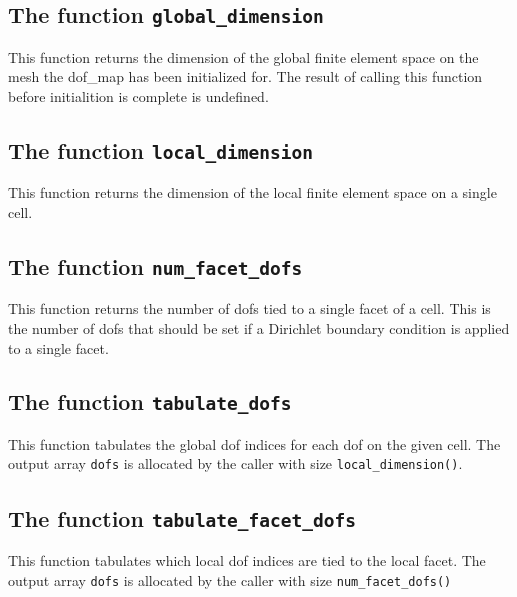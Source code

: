 \subsection{The function \texttt{global\_dimension}}
This function returns the dimension of the global finite element space on the mesh
the dof\_map has been initialized for.
The result of calling this function before initialition is complete is undefined.


\subsection{The function \texttt{local\_dimension}}
This function returns the dimension of the local finite element space on a single cell.


\subsection{The function \texttt{num\_facet\_dofs}}
This function returns the number of dofs tied to a single facet of a cell.
This is the number of dofs that should be set if a Dirichlet boundary condition is applied to a single facet.


\subsection{The function \texttt{tabulate\_dofs}}
This function tabulates the global dof indices for each dof on the given cell.
The output array \texttt{dofs} is allocated by the caller with size \texttt{local\_dimension()}.


\subsection{The function \texttt{tabulate\_facet\_dofs}}
This function tabulates which local dof indices are tied to the local facet.
The output array \texttt{dofs} is allocated by the caller with size \texttt{num\_facet\_dofs()}

